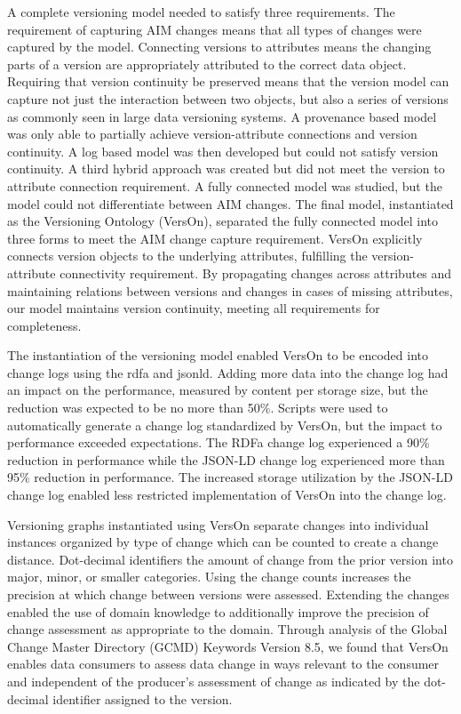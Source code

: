 A complete versioning model needed to satisfy three requirements.
The requirement of capturing AIM changes means that all types of changes were captured by the model.
Connecting versions to attributes means the changing parts of a version are appropriately attributed to the correct data object.
Requiring that version continuity be preserved means that the version model can capture not just the interaction between two objects, but also a series of versions as commonly seen in large data versioning systems.
A provenance based model was only able to partially achieve version-attribute connections and version continuity.
A log based model was then developed but could not satisfy version continuity.
A third hybrid approach was created but did not meet the version to attribute connection requirement.
A fully connected model was studied, but the model could not differentiate between AIM changes.
The final model, instantiated as the Versioning Ontology (VersOn), separated the fully connected model into three forms to meet the AIM change capture requirement.
VersOn explicitly connects version objects to the underlying attributes, fulfilling the version-attribute connectivity requirement.
By propagating changes across attributes and maintaining relations between versions and changes in cases of missing attributes, our model maintains version continuity, meeting all requirements for completeness.

The instantiation of the versioning model enabled VersOn to be encoded into change logs using the \acrfull{rdfa} and \acrfull{jsonld}.
Adding more data into the change log had an impact on the performance, measured by content per storage size, but the reduction was expected to be no more than 50\%.
Scripts were used to automatically generate a change log standardized by VersOn, but the impact to performance exceeded expectations.
The RDFa change log experienced a 90\% reduction in performance while the JSON-LD change log experienced more than 95\% reduction in performance.
The increased storage utilization by the JSON-LD change log enabled less restricted implementation of VersOn into the change log.

Versioning graphs instantiated using VersOn separate changes into individual instances organized by type of change which can be counted to create a change distance.
Dot-decimal identifiers the amount of change from the prior version into major, minor, or smaller categories.
Using the change counts increases the precision at which change between versions were assessed.
Extending the changes enabled the use of domain knowledge to additionally improve the precision of change assessment as appropriate to the domain.
Through analysis of the Global Change Master Directory (GCMD) Keywords Version 8.5, we found that VersOn enables data consumers to assess data change in ways relevant to the consumer and independent of the producer's assessment of change as indicated by the dot-decimal identifier assigned to the version.

